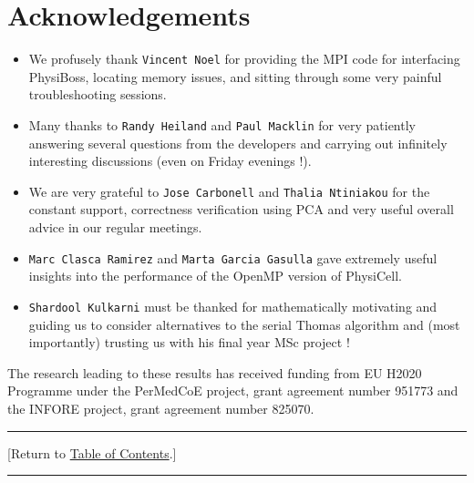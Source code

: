 \documentclass[12pt]{article}
\newcommand{\TOClink}{\begin{center}\hrule\vskip-5pt\phantom{.}\hfill[Return to \hyperlink{TOC}{Table of Contents}.]\hfill\phantom{.}\vskip3pt\hrule\end{center}}
\begin{document}
\section{Acknowledgements}
\begin{itemize}
    \item We profusely thank \texttt{Vincent Noel} for providing the MPI code for interfacing  PhysiBoss, locating memory issues, and sitting through some very painful troubleshooting sessions. 
    \item Many thanks to \texttt{Randy Heiland} and \texttt{Paul Macklin} for very patiently answering several questions from the developers and carrying out infinitely interesting discussions (even on Friday evenings !). 
    \item We are very grateful to \texttt{Jose Carbonell} and \texttt{Thalia Ntiniakou} for the constant support, correctness verification using PCA and very useful overall advice in our regular meetings. 
    \item \texttt{Marc Clasca Ramirez} and \texttt{Marta Garcia Gasulla} gave extremely useful insights into the performance of the OpenMP version of PhysiCell. 
    \item \texttt{Shardool Kulkarni} must be thanked for mathematically motivating and guiding us to consider alternatives to the serial Thomas algorithm and (most importantly) trusting us with his final year MSc project !  
\end{itemize}
The research leading to these results has received funding from EU H2020 Programme under the PerMedCoE project, grant agreement number 951773 and the INFORE project, grant agreement number 825070.
\TOClink



\end{document}
